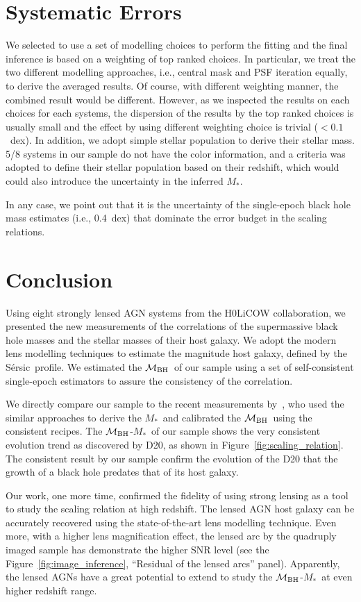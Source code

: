 \documentclass[fleqn,usenatbib]{mnras}
\newcommand{\mbh}{$\mathcal M_{\rm BH}$}
\newcommand{\sersic}{S\'ersic}
\newcommand{\mstar}{{$M_*$}}
\begin{document}
\section{Systematic Errors}\label{sec:diss}
We selected to use a set of modelling choices to perform the fitting and the final inference is based on a weighting of top ranked choices. In particular, we treat the two different modelling approaches, i.e., central mask and PSF iteration equally, to derive the averaged results. Of course, with different weighting manner, the combined result would be different. However, as we inspected the results on each choices for each systems, the dispersion of the results by the top ranked choices is usually small and the effect by using different weighting choice is trivial ($<0.1$~dex). In addition, we adopt simple stellar population to derive their stellar mass. 5/8 systems in our sample do not have the color information, and a criteria was adopted to define their stellar population based on their redshift, which would could also introduce the uncertainty in the inferred \mstar.

In any case, we point out that it is the uncertainty of the single-epoch black hole mass estimates (i.e., 0.4~dex) that dominate the error budget in the scaling relations. 

\section{Conclusion}\label{sec:con}
Using eight strongly lensed AGN systems from the H0LiCOW collaboration, we presented the new measurements of the correlations of the supermassive black hole masses and the stellar masses of their host galaxy. We adopt the modern lens modelling techniques to estimate the magnitude host galaxy, defined by the \sersic\ profile. We estimated the \mbh\ of our sample using a set of self-consistent single-epoch estimators to assure the consistency of the correlation.

We directly compare our sample to the recent measurements by~\citet[][D20]{Ding2020a}, who used the similar approaches to derive the \mstar\ and calibrated the \mbh\ using the consistent recipes. The \mbh-\mstar\ of our sample shows the very consistent evolution trend as discovered by D20, as shown in Figure~\ref{fig:scaling_relation}. The consistent result by our sample confirm the evolution of the D20 that the growth of a black hole predates that of its host galaxy.

Our work, one more time, confirmed the fidelity of using strong lensing as a tool to study the scaling relation at high redshift. The lensed AGN host galaxy can be accurately recovered using the state-of-the-art lens modelling technique. Even more, with a higher lens magnification effect, the lensed arc by the quadruply imaged sample has demonstrate the higher SNR level (see the Figure~\ref{fig:image_inference}, ``Residual of the lensed arcs'' panel). Apparently, the lensed AGNs have a great potential to extend to study the \mbh-\mstar\ at even higher redshift range. 
\end{document}
